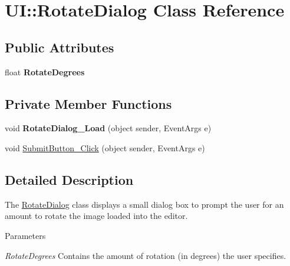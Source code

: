 \hypertarget{class_u_i_1_1_rotate_dialog}{
\section{UI::RotateDialog Class Reference}
\label{class_u_i_1_1_rotate_dialog}
}
\subsection*{Public Attributes}
\begin{DoxyCompactItemize}
\item 
\hypertarget{class_u_i_1_1_rotate_dialog_a6ea5257142dfe12543d77ab37bdf0edc}{
float {\bfseries RotateDegrees}}
\label{class_u_i_1_1_rotate_dialog_a6ea5257142dfe12543d77ab37bdf0edc}

\end{DoxyCompactItemize}
\subsection*{Private Member Functions}
\begin{DoxyCompactItemize}
\item 
\hypertarget{class_u_i_1_1_rotate_dialog_a81382e5dea746430a971d60d9c7d4ab5}{
void {\bfseries RotateDialog\_\-Load} (object sender, EventArgs e)}
\label{class_u_i_1_1_rotate_dialog_a81382e5dea746430a971d60d9c7d4ab5}

\item 
void \hyperlink{class_u_i_1_1_rotate_dialog_ac7b57eb47857579ea2ee9be19d92c032}{SubmitButton\_\-Click} (object sender, EventArgs e)
\end{DoxyCompactItemize}


\subsection{Detailed Description}
The \hyperlink{class_u_i_1_1_rotate_dialog}{RotateDialog} class displays a small dialog box to prompt the user for an amount to rotate the image loaded into the editor.


\begin{DoxyParams}{Parameters}
\item[{\em RotateDegrees}]Contains the amount of rotation (in degrees) the user specifies. \end{DoxyParams}


